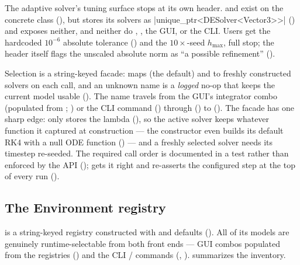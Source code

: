 The adaptive solver's tuning surface stops at its own header.  and
 exist on the concrete class (), but
 stores its solvers as \cppinline|unique_ptr<DESolver<Vector3>>|
() and exposes neither, and neither do ,
, the GUI, or the CLI. Users get the hardcoded $10^{-6}$ absolute tolerance
() and the $10\times$-seed $h_{\max}$, full stop; the header itself
flags the unscaled absolute norm as ``a possible refinement'' ().

Selection is a string-keyed facade:  maps  (the
default) and  to freshly constructed solvers on each
 call, and an unknown name is a \emph{logged} no-op that keeps the
current model usable (). The name travels from the GUI's integrator
combo (populated from ;
) or the CLI  command
() through 
() to  (). The
facade has one sharp edge:  only stores the lambda
(), so the active solver keeps whatever function it captured at
construction --- the constructor even builds its default RK4 with a null ODE function
() --- and a freshly selected solver needs its timestep re-seeded. The
required call order is documented in a test rather than enforced by the API
();  gets it right and re-asserts the
configured step at the top of every run ().

\subsection{The Environment registry}\label{sec:sim-env}

 is a string-keyed registry constructed with  and
 defaults (). All of its models are genuinely
runtime-selectable from both front ends --- GUI combos populated from the registries
() and the CLI / commands
(, ).  summarizes the
inventory.

